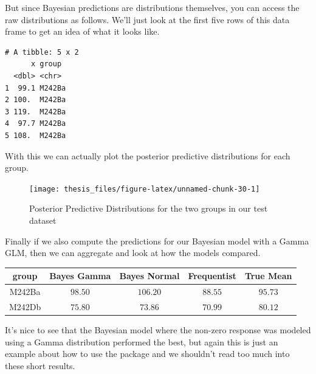 \documentclass[12pt,twoside]{reedthesis}
\newenvironment{Shaded}{\begin{snugshade}}{\end{snugshade}}
\newcommand{\AttributeTok}[1]{\textcolor[rgb]{0.77,0.63,0.00}{#1}}
\newcommand{\ConstantTok}[1]{\textcolor[rgb]{0.00,0.00,0.00}{#1}}
\newcommand{\DecValTok}[1]{\textcolor[rgb]{0.00,0.00,0.81}{#1}}
\newcommand{\FloatTok}[1]{\textcolor[rgb]{0.00,0.00,0.81}{#1}}
\newcommand{\FunctionTok}[1]{\textcolor[rgb]{0.00,0.00,0.00}{#1}}
\newcommand{\NormalTok}[1]{#1}
\newcommand{\SpecialCharTok}[1]{\textcolor[rgb]{0.00,0.00,0.00}{#1}}
\begin{document}
But since Bayesian predictions are distributions themselves, you can access the raw distributions as follows. We'll just look at the first five rows of this data frame to get an idea of what it looks like.
\begin{Shaded}
\end{Shaded}
\begin{verbatim}
# A tibble: 5 x 2
      x group 
  <dbl> <chr> 
1  99.1 M242Ba
2 100.  M242Ba
3 119.  M242Ba
4  97.7 M242Ba
5 108.  M242Ba
\end{verbatim}
With this we can actually plot the posterior predictive distributions for each group.
\begin{Shaded}
\end{Shaded}
\begin{figure}

{\centering \texttt{[image: thesis\_files/figure-latex/unnamed-chunk-30-1]} 

}

\caption{Posterior Predictive Distributions for the two groups in our test dataset}\label{fig:unnamed-chunk-30}
\end{figure}
Finally if we also compute the predictions for our Bayesian model with a Gamma GLM, then we can aggregate and look at how the models compared.
\begin{longtable}{ccccc}
\toprule
group & Bayes Gamma & Bayes Normal & Frequentist & True Mean \\ 
\midrule
M242Ba & $98.50$ & $106.20$ & $88.55$ & $95.73$ \\ 
M242Db & $75.80$ & $73.86$ & $70.99$ & $80.12$ \\ 
\bottomrule
\end{longtable}
It's nice to see that the Bayesian model where the non-zero response was modeled using a Gamma distribution performed the best, but again this is just an example about how to use the package and we shouldn't read too much into these short results.
\end{document}
